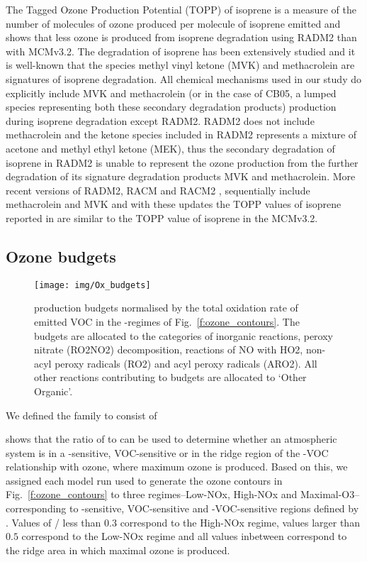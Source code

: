 The Tagged Ozone Production Potential (TOPP) of isoprene is a measure of the number of molecules of ozone produced per molecule of isoprene emitted and \citet{Coates:2015} shows that less ozone is produced from isoprene degradation using RADM2 than with MCMv3.2.
The degradation of isoprene has been extensively studied and it is well-known that the species methyl vinyl ketone (MVK) and methacrolein are signatures of isoprene degradation.
All chemical mechanisms used in our study do explicitly include MVK and methacrolein (or in the case of CB05, a lumped species representing both these secondary degradation products) production during isoprene degradation except RADM2.
RADM2 does not include methacrolein and the ketone species included in RADM2 represents a mixture of acetone and methyl ethyl ketone (MEK), thus the secondary degradation of isoprene in RADM2 is unable to represent the ozone production from the further degradation of its signature degradation products MVK and methacrolein.
More recent versions of RADM2, RACM \citep{Stockwell:1997} and RACM2 \citep{Goliff:2013}, sequentially include methacrolein and MVK and with these updates the TOPP values of isoprene reported in \citet{Coates:2015} are similar to the TOPP value of isoprene in the MCMv3.2.

\subsection{Ozone budgets} \label{ss:r_budgets}

\begin{figure}%
    \centering%
    \caption{ production budgets normalised by the total oxidation rate of emitted VOC in the -regimes of Fig.~\ref{f:ozone_contours}. The budgets are allocated to the categories of inorganic reactions, peroxy nitrate (RO2NO2) decomposition, reactions of NO with HO2, non-acyl peroxy radicals (RO2) and acyl peroxy radicals (ARO2). All other reactions contributing to  budgets are allocated to `Other Organic'.}%
    \label{f:ozone_budgets}%
    \texttt{[image: img/Ox\_budgets]}
\end{figure}

We defined the  family to consist of 

\citet{Sillman:1995} shows that the ratio of  to  can be used to determine whether an atmospheric system is in a -sensitive, VOC-sensitive or in the ridge region of the -VOC relationship with ozone, where maximum ozone is produced.
Based on this, we assigned each model run used to generate the ozone contours in Fig.~\ref{f:ozone_contours} to three  regimes--Low-NOx, High-NOx and Maximal-O3--corresponding to -sensitive, VOC-sensitive and -VOC-sensitive regions defined by \citet{Sillman:1995}.
Values of / less than $0.3$ correspond to the High-NOx regime, values larger than $0.5$ correspond to the Low-NOx regime and all values inbetween correspond to the ridge area in which maximal ozone is produced.

